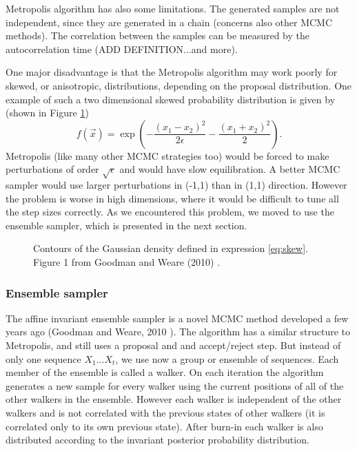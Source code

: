 \documentclass{wihuri}
\def\be{\begin{equation}}
\def\ee{\end{equation}}
\begin{document}
Metropolis algorithm has also some limitations. The generated samples are not independent, since they are generated in a chain (concerns also other MCMC methods). The correlation between the samples can be measured by the autocorrelation time (ADD DEFINITION...and more). %

One major disadvantage is that the Metropolis algorithm may work poorly for skewed, or anisotropic, distributions, depending on the proposal distribution. One example of such a two dimensional skewed probability distribution is given by (shown in Figure \ref{fig:skewed})
\be \label{eq:skew} 
f(\vec{x}) = \exp(-\frac{(x_{1}-x_{2})^{2}}{2\epsilon}-\frac{(x_{1}+x_{2})^{2}}{2}).
\ee
Metropolis (like many other MCMC strategies too) would be forced to make perturbations of order $\sqrt{\epsilon}$ and would have slow equilibration. A better MCMC sampler would use larger perturbations in (-1,1) than in (1,1) direction. However the problem is worse in high dimensions, where it would be difficult to tune all the step sizes correctly. As we encountered this problem, we  moved to use the ensemble sampler, which is presented in the next section. 


\begin{figure}
\centerline{}
\caption{Contours of the Gaussian density defined in expression \ref{eq:skew}. Figure 1 from Goodman and Weare (2010) \cite{ensemble1}.
\label{fig:skewed}}
\end{figure}


\subsubsection{Ensemble sampler}

The affine invariant ensemble sampler is a novel MCMC method developed a few years ago (Goodman and Weare, 2010 \cite{ensemble1}). The algorithm has a similar structure to Metropolis, and still uses a proposal and and accept/reject step. But instead of only one sequence $X_{1}...X_{t}$, we use now a group or ensemble of sequences. Each member of the ensemble is called a walker. On each iteration the algorithm generates a new sample for every walker using the  current positions of all of the other walkers in
the ensemble. However each walker is independent of the other walkers and is not correlated with the previous states of other walkers (it is correlated only to its own previous state). After burn-in each walker is also distributed according to the invariant posterior probability distribution.
\end{document}

